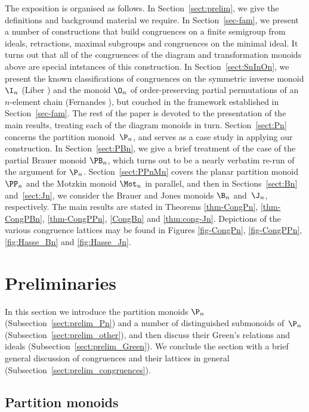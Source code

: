 The exposition is organised as follows.  In Section~\ref{sect:prelim}, we give
the definitions and background material we require.  
%
In Section~\ref{sec-fam}, we present a number of constructions that build congruences on a finite semigroup from ideals, retractions, maximal subgroups and congruences on the minimal ideal.  It turns out that all of the congruences of the diagram and transformation monoids above are special intstances of this construction.  
%
In
Section~\ref{sect:SnInOn}, we present the known classifications of congruences
on the symmetric inverse monoid $\I_n$ (Liber \cite{Liber1953}) and the monoid
$\O_n$ of order-preserving partial permutations of an $n$-element chain (Fernandes
\cite{Fernandes2001}), but couched in the framework established in
Section~\ref{sec-fam}.  The rest of the paper is devoted to the
presentation of the main results, treating each of the diagram monoids in turn.
Section~\ref{sect:Pn} concerns the partition monoid~$\P_n$, and serves as
a case study in applying our construction.  In Section~\ref{sect:PBn}, we give a brief treatment of the case of the partial
Brauer monoid $\PB_n$, which turns out to be a nearly verbatim re-run of the
argument for $\P_n$.  Section~\ref{sect:PPnMn} covers the planar partition
monoid $\PP_n$ and the Motzkin monoid $\Mot_n$ in parallel, and then in 
Sections~\ref{sect:Bn} and~\ref{sect:Jn}, we consider the Brauer and Jones
monoids $\B_n$ and~$\J_n$, respectively.  
%
The main results are stated in Theorems \ref{thm-CongPn}, \ref{thm-CongPBn}, \ref{thm-CongPPn}, \ref{CongBn} and \ref{thm:cong-Jn}.  Depictions of the various congruence lattices may be found in Figures \ref{fig-CongPn}, \ref{fig-CongPPn}, \ref{fig:Hasse_Bn} and \ref{fig:Hasse_Jn}.

\section{Preliminaries}\label{sec:prelim}

In this section we introduce the partition monoids $\P_n$
(Subsection~\ref{sect:prelim_Pn}) and a number of distinguished submonoids
of~$\P_n$ (Subsection~\ref{sect:prelim_other}), and then discuss their Green's
relations and ideals (Subsection~\ref{sect:prelim_Green}).  We conclude the
section with a brief general discussion of congruences and their lattices in
general (Subsection~\ref{sect:prelim_congruences}).

\subsection{Partition monoids}\label{sec:prelim_Pn}

